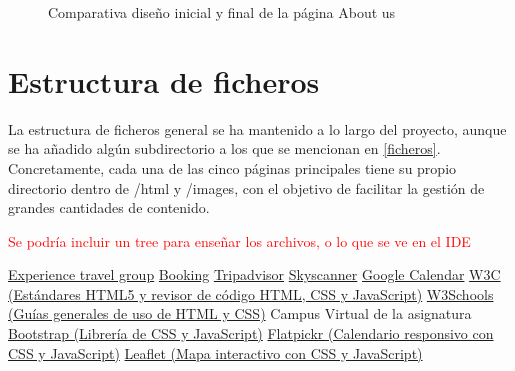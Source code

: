 \documentclass[11pt, a4paper]{book}
\begin{document}
\begin{figure} [H]
\begin{minipage}[c]{0.45\textwidth}
		\end{minipage}
		\caption{Comparativa diseño inicial y final de la página About us}
	\end{figure}
	
	
	\section{Estructura de ficheros}
	La estructura de ficheros general se ha mantenido a lo largo del proyecto, aunque se ha añadido algún subdirectorio a los que se mencionan en \ref{ficheros}. Concretamente, cada una de las cinco páginas principales tiene su propio directorio dentro de /html y /images, con el objetivo de facilitar la gestión de grandes cantidades de contenido.
	
	\begin{huge}
		\textcolor{red}{Se podría incluir un tree para enseñar los archivos, o lo que se ve en el IDE}
	\end{huge}

	\begin{thebibliography}{9}
		 \href{https://experiencetravelgroup.com}{Experience travel group}
		 \href{https://booking.com}{Booking}
		 \href{https://tripadvisor.es}{Tripadvisor}
		 \href{https://skyscanner.es}{Skyscanner}
		 \href{https://calendar.google.com/calendar/u/0/r}{Google Calendar}
		 \href{https://html.spec.whatwg.org/multipage/}{W3C (Estándares HTML5 y revisor de código HTML, CSS y JavaScript)}
		 \href{https://www.w3schools.com/}{W3Schools (Guías generales de uso de HTML y CSS)} 
		 Campus Virtual de la asignatura
		 \href{https://getbootstrap.com/}{Bootstrap (Librería de CSS y JavaScript)}
		 \href{https://flatpickr.js.org/}{Flatpickr (Calendario responsivo con CSS y JavaScript)}
         \href{https://leafletjs.com/}{Leaflet (Mapa interactivo con CSS y JavaScript)}
	\end{thebibliography}
	
\end{document}
